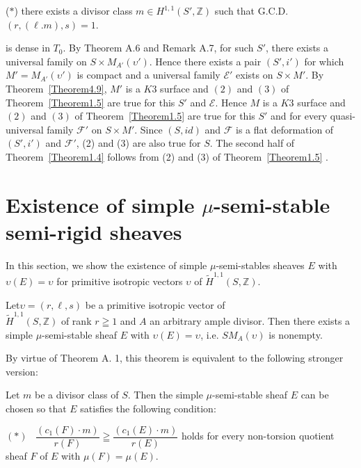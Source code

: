 ($\ast$) there exists a divisor class $m\in H^{1,1}(S',\mathbb{Z})$
such that G.C.D. $(r,(\ell.m),s)=1$. 

is dense in $T_0$. By Theorem A.6 and Remark A.7, for such $S'$, there
exists a universal family on $S\times M_{A'}(\upsilon')$. Hence there
exists a pair $(S',i')$ for which $M'=M_{A'}(\upsilon')$ is compact and
a universal family $\mathscr{E}'$ exists on $S\times M'$. By
Theorem~\ref{Theorem4.9}, $M'$ is a $K3$ surface and $(2)$ and $(3)$
of Theorem~\ref{Theorem1.5} are true for this $S'$ and
$\mathscr{E}$. Hence $M$ is a $K3$ surface and $(2)$ and $(3)$ of
Theorem~\ref{Theorem1.5} are true for this $S'$ and for every
quasi-universal family $\mathscr{F}'$ on $S\times M'$. Since $(S,id)$
and $\mathscr{F}$ is a flat deformation of $(S',i')$ and
$\mathscr{F}'$, (2) and (3) are also true for $S$. The second half of
Theorem~\ref{Theorem1.4} follows from (2) and (3) of Theorem~\ref{Theorem1.5}
\enprf.

\section[Existence of simple...]{Existence of
simple \texorpdfstring{$\mu$}{eq}-semi-stable\\ semi-rigid
sheaves}\label{s5}

In this section, we show the existence of simple $\mu$-semi-stables
sheaves $E$ with $\upsilon(E)=\upsilon$ for primitive isotropic
vectors $\upsilon$ of $\widetilde{H}^{1,1}(S,\mathbb{Z})$. 

\begin{Theorem}\label{Theorem5.1} 
Let\pageoriginale $\upsilon=(r,\ell, s)$ be a primitive isotropic vector of\\
$\widetilde{H}^{1,1}(S,\mathbb{Z})$ of rank $r\geqq 1$ and $A$ an
arbitrary ample divisor. Then there exists a simple $\mu$-semi-stable
sheaf $E$ with $\upsilon(E)=\upsilon$, i.e. $SM_A(\upsilon)$ is
nonempty.
\end{Theorem}

By virtue of Theorem A. 1, this theorem is equivalent to the following
stronger version:

\begin{Theorem}\label{Theorem5.2}
Let $m$ be a divisor class of $S$. Then the simple $\mu$-semi-stable
sheaf $E$ can be chosen so that $E$ satisfies the following condition:

$(\ast)$~ $\dfrac{(c_1(F)\cdot m)}{r(F)}\geqq \dfrac{(c_1(E)\cdot
m)}{r(E)}$ holds for every non-torsion quotient sheaf $F$ of $E$ with
$\mu(F)=\mu(E)$. 
\end{Theorem}

